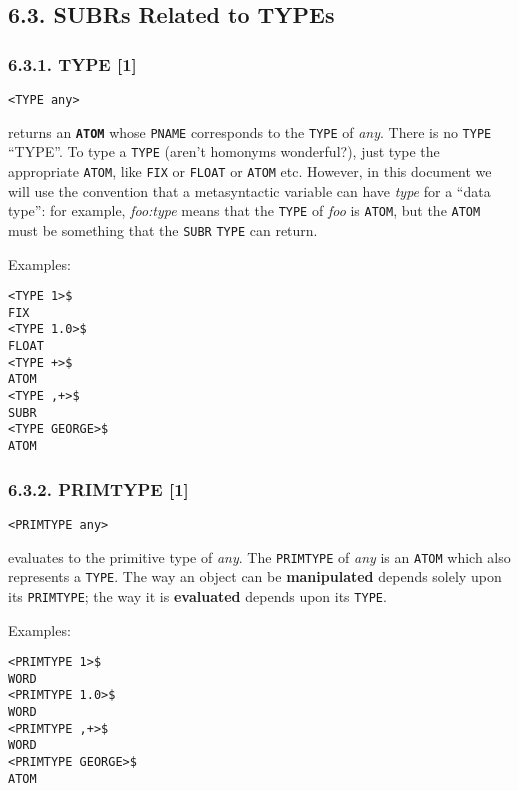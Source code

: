 \documentclass[a4paper,]{article}
\begin{document}
\subsection{6.3. SUBRs Related to TYPEs}\label{subrs-related-to-types}

\subsubsection{6.3.1. TYPE {[}1{]}}\label{type-1}

\begin{verbatim}
<TYPE any>
\end{verbatim}

 returns an \textbf{\texttt{ATOM}} whose \texttt{PNAME} corresponds to the \texttt{TYPE} of
\emph{any}. There is no \texttt{TYPE} ``TYPE''. To type a \texttt{TYPE} (aren't homonyms wonderful?), just type the
appropriate \texttt{ATOM}, like \texttt{FIX} or \texttt{FLOAT} or \texttt{ATOM} etc. However, in this document we will use
the convention that a metasyntactic variable can have \emph{type} for a ``data type'': for example, \emph{foo:type} means
that the \texttt{TYPE} of \emph{foo} is \texttt{ATOM}, but the \texttt{ATOM} must be something that the \texttt{SUBR}
\texttt{TYPE} can return.

Examples:

\begin{verbatim}
<TYPE 1>$
FIX
<TYPE 1.0>$
FLOAT
<TYPE +>$
ATOM
<TYPE ,+>$
SUBR
<TYPE GEORGE>$
ATOM
\end{verbatim}

\subsubsection{6.3.2. PRIMTYPE {[}1{]}}\label{primtype-1}

\begin{verbatim}
<PRIMTYPE any>
\end{verbatim}

 evaluates to the primitive type of \emph{any}. The \texttt{PRIMTYPE} of \emph{any} is an
\texttt{ATOM} which also represents a \texttt{TYPE}. The way an object can be \textbf{manipulated} depends solely upon its
\texttt{PRIMTYPE}; the way it is \textbf{evaluated} depends upon its \texttt{TYPE}.

Examples:

\begin{verbatim}
<PRIMTYPE 1>$
WORD
<PRIMTYPE 1.0>$
WORD
<PRIMTYPE ,+>$
WORD
<PRIMTYPE GEORGE>$
ATOM
\end{verbatim}
\end{document}
